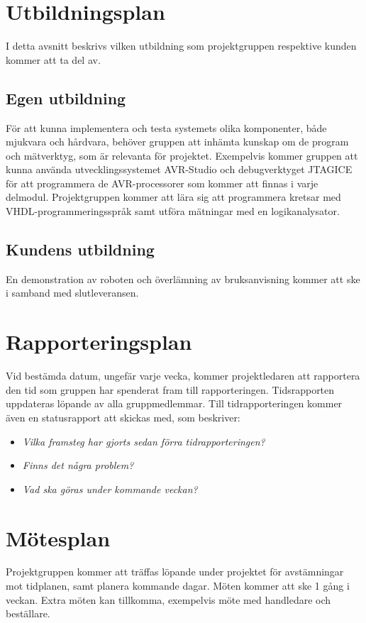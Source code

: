 \documentclass[11pt]{article}
\begin{document}
\begin{flushleft}


\section{Utbildningsplan}
I detta avsnitt beskrivs vilken utbildning som projektgruppen respektive kunden kommer att ta del av.

\subsection{Egen utbildning}
För att kunna implementera och testa systemets olika komponenter, både mjukvara och hårdvara, behöver gruppen att inhämta kunskap om de program och mätverktyg, som är relevanta för projektet. Exempelvis kommer gruppen att kunna använda utvecklingssystemet AVR-Studio och debugverktyget JTAGICE för att programmera de AVR-processorer som kommer att finnas i varje delmodul. Projektgruppen kommer att lära sig att programmera kretsar med VHDL-programmeringsspråk samt utföra mätningar med en logikanalysator.

\subsection{Kundens utbildning}
En demonstration av roboten och överlämning av bruksanvisning kommer att ske i samband med slutleveransen.

\pagebreak

\section{Rapporteringsplan}
Vid bestämda datum, ungefär varje vecka, kommer projektledaren att rapportera den tid som gruppen har spenderat fram till rapporteringen. Tidsrapporten uppdateras löpande av alla gruppmedlemmar. Till tidrapporteringen kommer även en statusrapport att skickas med, som beskriver:\\
\begin{itemize}
	\item \textit{Vilka framsteg har gjorts sedan förra tidrapporteringen?}
	\item \textit{Finns det några problem?}
	\item \textit{Vad ska göras under kommande veckan?}
\end{itemize}

\section{Mötesplan}
Projektgruppen kommer att träffas löpande under projektet för avstämningar mot tidplanen, samt planera kommande dagar. Möten kommer att ske 1 gång i veckan. Extra möten kan tillkomma, exempelvis möte med handledare och beställare.



\end{flushleft}
\end{document}
